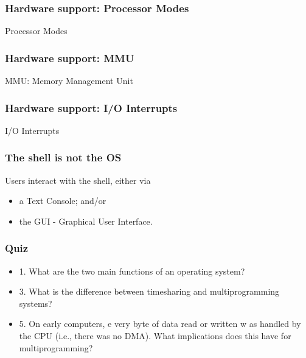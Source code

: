 \begin{frame}
    \frametitle{Hardware support: Processor Modes}
    
    Processor Modes

\end{frame}

\begin{frame}
    \frametitle{Hardware support: MMU}
    
    MMU: Memory Management Unit
    
\end{frame}

\begin{frame}
    \frametitle{Hardware support: I/O Interrupts}
    
    I/O Interrupts
    
\end{frame}

\begin{frame}
    \frametitle{The shell is not the OS}
    
    Users interact with the shell, either via 
    \begin{itemize}
        \item a Text Console; and/or
        \item the GUI - Graphical User Interface.
    \end{itemize}

\end{frame}



\begin{frame}
    \frametitle{Quiz}
    
    \begin{itemize}
        \item
        1. What are the two main functions of an operating system?
        \item
        3. What is the difference between timesharing and multiprogramming systems?
        \item
        5. On early computers, e very byte of data read or written w as handled by the CPU (i.e.,
        there was no DMA). What implications does this have for multiprogramming?
    \end{itemize}    

\end{frame}

